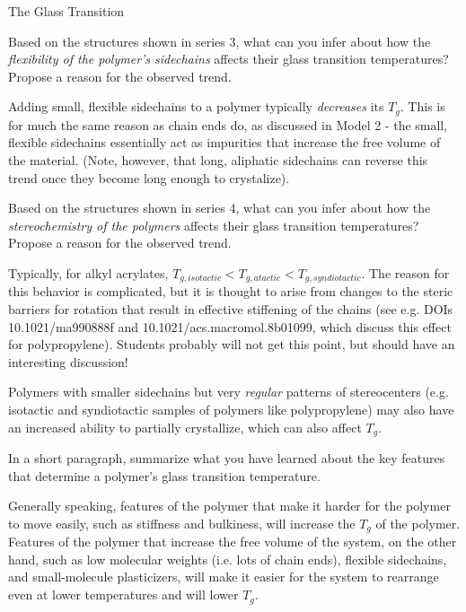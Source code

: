 \begin{activity}{The Glass Transition}
\begin{ctqs}
	\question Based on the structures shown in series 3, what can you infer about how the \emph{flexibility of the polymer's sidechains} affects their glass transition temperatures?  Propose a reason for the observed trend.
	
		\begin{solution}[0.75in]
			Adding small, flexible sidechains to a polymer typically \emph{decreases} its $T_g$.  This is for much the same reason as chain ends do, as discussed in Model 2 - the small, flexible sidechains essentially act as impurities that increase the free volume of the material.  (Note, however, that long, aliphatic sidechains can reverse this trend once they become long enough to crystalize).
		\end{solution}
		
	\question Based on the structures shown in series 4, what can you infer about how the \emph{stereochemistry of the polymers} affects their glass transition temperatures?  Propose a reason for the observed trend.
	
		\begin{solution}[1in]
			Typically, for alkyl acrylates, $T_{g,isotactic}<T_{g,atactic}<T_{g,syndiotactic}$.  The reason for this behavior is complicated, but it is thought to arise from changes to the steric barriers for rotation that result in effective stiffening of the chains (see e.g. DOIs 10.1021/ma990888f and 10.1021/acs.macromol.8b01099, which discuss this effect for polypropylene).  Students probably will not get this point, but should have an interesting discussion!
			
			Polymers with smaller sidechains but very \emph{regular} patterns of stereocenters (e.g. isotactic and syndiotactic samples of polymers like polypropylene) may also have an increased ability to partially crystallize, which can also affect $T_g$.
		\end{solution}
	
	\question In a short paragraph, summarize what you have learned about the key features that determine a polymer's glass transition temperature.
	
		\begin{solution}[2in]
			Generally speaking, features of the polymer that make it harder for the polymer to move easily, such as stiffness and bulkiness, will increase the $T_g$ of the polymer.  Features of the polymer that increase the free volume of the system, on the other hand, such as low molecular weights (i.e. lots of chain ends), flexible sidechains, and small-molecule plasticizers, will make it easier for the system to rearrange even at lower temperatures and will lower $T_g$.
		\end{solution}
	

\end{ctqs}
\end{activity}
